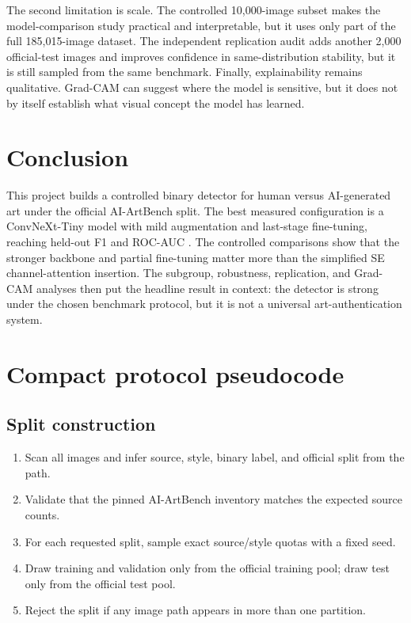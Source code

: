 \documentclass[11pt,a4paper]{article}
\begin{document}
The second limitation is scale. The controlled 10,000-image subset makes the
model-comparison study practical and interpretable, but it uses only part of
the full 185,015-image dataset. The independent replication audit adds another 2,000
official-test images and improves confidence in same-distribution stability,
but it is still sampled from the same benchmark. Finally, explainability
remains qualitative. Grad-CAM can suggest where the model is sensitive, but it
does not by itself establish what visual concept the model has learned.

\section{Conclusion}

This project builds a controlled binary detector for human versus AI-generated
art under the official AI-ArtBench split. The best measured configuration is a
ConvNeXt-Tiny model with mild augmentation and last-stage fine-tuning, reaching
held-out F1 \BestTestFOne{} and ROC-AUC \BestTestAUC. The controlled
comparisons show that the stronger backbone and partial fine-tuning matter more
than the simplified SE channel-attention insertion. The subgroup,
robustness, replication, and Grad-CAM analyses then put the headline result in
context: the detector is strong under the chosen benchmark protocol, but it is
not a universal art-authentication system.

\appendix
\section{Compact protocol pseudocode}

\subsection*{Split construction}
\begin{enumerate}[leftmargin=*]
  \item Scan all images and infer source, style, binary label, and official
  split from the path.
  \item Validate that the pinned AI-ArtBench inventory matches the expected
  source counts.
  \item For each requested split, sample exact source/style quotas with a
  fixed seed.
  \item Draw training and validation only from the official training pool;
  draw test only from the official test pool.
  \item Reject the split if any image path appears in more than one partition.
\end{enumerate}
\end{document}
